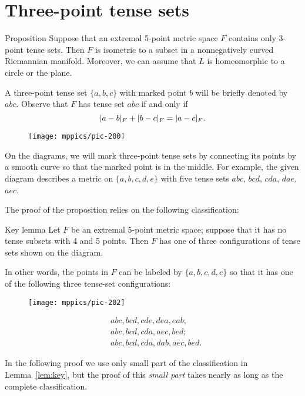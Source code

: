 \documentclass{article}
\begin{document}
\section{Three-point tense sets}\label{sec:3-tense}

\begin{thm}{Proposition}\label{prop:3-tense}
Suppose that an extremal 5-point metric space $F$ contains only 3-point tense sets.
Then $F$ is isometric to a subset in a nonnegatively curved Riemannian manifold.
Moreover, we can assume that $L$ is homeomorphic to a circle or the plane.
\end{thm}

A three-point tense set $\{a,b,c\}$ with marked point $b$ will be briefly denoted by $abc$.
Observe that $F$ has tense set $abc$ if and only if 
\[|a-b|_F+|b-c|_F\z=|a-c|_F.\]

\begin{wrapfigure}{r}{20mm}
\vskip-0mm
\centering
\texttt{[image: mppics/pic-200]}
\end{wrapfigure}

On the diagrams, we will mark three-point tense sets by connecting its points by a smooth curve so that the marked point is in the middle.
For example, the given diagram describes a metric on $\{a,b,c,d,e\}$ with five tense sets $abc$, $bcd$, $cda$, $dae$, $aec$.

The proof of the proposition relies on the following classification:

\begin{thm}{Key lemma}\label{lem:key}
Let $F$ be an extremal 5-point metric space; suppose that it has no tense subsets with 4 and 5 points.
Then $F$ has one of three configurations of tense sets shown on the diagram.

In other words, the points in $F$ can be labeled by $\{a,b,c,d,e\}$ so that it has
one of the following three tense-set configurations:

\begin{wrapfigure}{r}{45mm}
\vskip3mm
\centering
\texttt{[image: mppics/pic-202]}
\end{wrapfigure}
\vskip-6mm
\begin{align*}
&abc, bcd, cde, dea, eab;
\\
&abc, bcd, cda, aec, bed;
\\
&abc, bcd, cda, dab, aec, bed.
\end{align*}

\end{thm}

In the following proof we use only small part of the classification in Lemma~\ref{lem:key},
but the proof of this \emph{small part} takes nearly as long as the complete classification.
\end{document}
